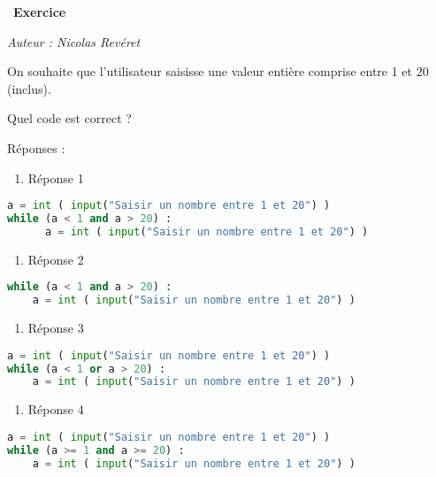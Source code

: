 \documentclass[
  11pt,
]{article}
\providecommand{\tightlist}{%
  \setlength{\itemsep}{0pt}\setlength{\parskip}{0pt}}
\newcounter{exo}
\newenvironment{exercice}[1]
{\par \medskip   \addtocounter{exo}{1} \noindent  
\begin{bclogo}[arrondi =0.1,   noborder = true, logo=\bccrayon, marge=4]{~\textbf{Exercice} \textbf{\theexo} {\itshape #1} }  \par}
{
\end{bclogo}
 \par \bigskip }
\newcounter{def}
\begin{document}
\begin{exercice}{}

\emph{Auteur : Nicolas Revéret}

On souhaite que l'utilisateur saisisse une valeur entière comprise entre
1 et 20 (inclus).

Quel code est correct ?

Réponses :

\begin{enumerate}
\def\labelenumi{\arabic{enumi}.}
\tightlist
\item
  Réponse 1
\end{enumerate}

\begin{lstlisting}[language=Python]
a = int ( input("Saisir un nombre entre 1 et 20") )
while (a < 1 and a > 20) :
      a = int ( input("Saisir un nombre entre 1 et 20") )
\end{lstlisting}

\begin{enumerate}
\def\labelenumi{\arabic{enumi}.}
\setcounter{enumi}{1}
\tightlist
\item
  Réponse 2
\end{enumerate}

\begin{lstlisting}[language=Python]
while (a < 1 and a > 20) :
    a = int ( input("Saisir un nombre entre 1 et 20") )
\end{lstlisting}

\begin{enumerate}
\def\labelenumi{\arabic{enumi}.}
\setcounter{enumi}{2}
\tightlist
\item
  Réponse 3
\end{enumerate}

\begin{lstlisting}[language=Python]
a = int ( input("Saisir un nombre entre 1 et 20") )
while (a < 1 or a > 20) :
    a = int ( input("Saisir un nombre entre 1 et 20") )
\end{lstlisting}

\begin{enumerate}
\def\labelenumi{\arabic{enumi}.}
\setcounter{enumi}{3}
\tightlist
\item
  Réponse 4
\end{enumerate}

\begin{lstlisting}[language=Python]
a = int ( input("Saisir un nombre entre 1 et 20") )
while (a >= 1 and a >= 20) :
    a = int ( input("Saisir un nombre entre 1 et 20") )
\end{lstlisting}

\end{exercice}
\end{document}
